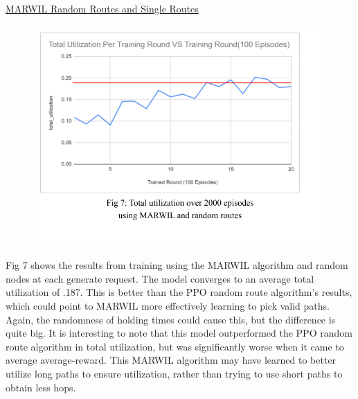 \documentclass[conference]{IEEEtran}
\begin{document}
\begin{flushleft}
\underline{MARWIL Random Routes and Single Routes}
\begin{figure}[ht!]
    \includegraphics[width=.75\linewidth]{Final Paper Results And Graphs (5).png}
\end{figure}
\newline \newline
Fig 7 shows the results from training using the MARWIL algorithm and random nodes at each generate request. The model converges to an average total utilization of .187. This is better than the PPO random route algorithm's results, which could point to MARWIL more effectively learning to pick valid paths. Again, the randomness of holding times could cause this, but the difference is quite big. It is interesting to note that this model outperformed the PPO random route algorithm in total utilization, but was significantly worse when it came to average average-reward. This MARWIL algorithm may have learned to better utilize long paths to ensure utilization, rather than trying to use short paths to obtain less hops.
\newline \newline
\newline \newline
\newline \newline


\end{flushleft}
\end{document}
